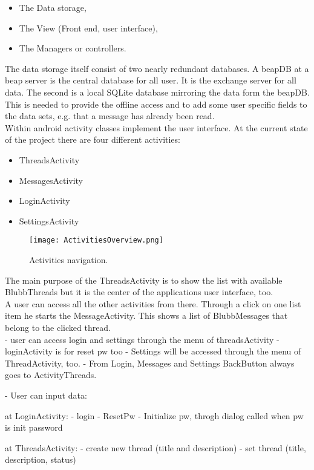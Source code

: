 \documentclass[12pt,a4paper,oneside]{report}
\newcommand{\beapDB}{beapDB}
\newcommand{\beapServer}{beap server}
\begin{document}
\begin{itemize}
\item{The Data storage,}
\item{The View (Front end, user interface),}
\item{The Managers or controllers.}
\end{itemize}

The data storage itself consist of two nearly redundant databases. A \beapDB{} at a \beapServer{} is the central database for all user. It is the exchange server for all data. The second is a local SQLite database mirroring the data form the \beapDB{}. This is needed to provide the offline access and to add some user specific fields to the data sets, e.g. that a message has already been read.\\
Within android activity classes implement the user interface. At the current state of the project there are four different activities:

\begin{itemize}
\item{ThreadsActivity}
\item{MessagesActivity}
\item{LoginActivity}
\item{SettingsActivity}
\end{itemize}

\begin{figure}[!ht]
	\centering
    \texttt{[image: ActivitiesOverview.png]}
	\caption{Activities navigation.}
\end{figure}

The main purpose of the ThreadsActivity is to show the list with available BlubbThreads but it is the center of the applications user interface, too.\\ A user can access all the other activities from there. Through a click on one list item he starts the MessageActivity. This shows a list of BlubbMessages that belong to the clicked thread. \\
- user can access login and settings through the menu of threadsActivity
- loginActivity is for reset pw too
- Settings will be accessed through the menu of ThreadActivity, too.
- From Login, Messages and Settings BackButton always goes to ActivityThreads.


- User can input data: 

at LoginActivity:
- login
- ResetPw
- Initialize pw, throgh dialog called when pw is init password

at ThreadsActivity:
- create new thread (title and description)
- set thread (title, description, status)
\end{document}
